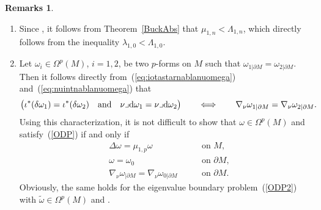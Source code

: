 \documentclass[10pt,a4paper]{amsart}
\numberwithin{equation}{section}
\theoremstyle{definition}
\newtheorem{Remarks}[Theorem]{Remarks}
\begin{document}
\begin{Remarks}\label{r:Schifferreformulated}
\noindent\begin{enumerate}\itemsep=0pt
\item Since , it follows from Theorem~\ref{BuckAbs} that $\mu_{1,n}<\Lambda_{1,n}$, which directly follows from the inequality $\lambda_{1,0}<\Lambda_{1,0}$.
\item Let $\omega_i\in\Omega^p(M)$, $i=1,2$, be two $p$-forms on $M$ such that $\omega_{1|\partial M}=\omega_{2|\partial M}$. Then it follows directly from~(\ref{eq:iotastarnablanuomega}) and~(\ref{eq:nuintnablanuomega}) that
\[
\bigl(\iota^*(\delta\omega_1)=\iota^*(\delta\omega_2)\quad\text{and}\quad\nu\lrcorner {\rm d}\omega_1=\nu\lrcorner {\rm d}\omega_2\bigr)\qquad\Longleftrightarrow\qquad\nabla_\nu\omega_{1|\partial M}=\nabla_\nu\omega_{2|\partial M}.
\]
Using this characterization, it is not difficult to show that $\omega\in\Omega^p(M)$ and  satisfy~(\ref{ODP}) if and only if
\[
\begin{aligned}
&\Delta \omega =\mu_{1,p} \omega \ \quad &&\textrm{on } M, \\
&\omega = \omega_0\ \quad && \textrm{on }\partial M, \\
&\nabla_\nu\omega_{|\partial M} = \nabla_\nu\omega_{0|\partial M}\ \quad &&\textrm{on }\partial M.
\end{aligned}
\]
Obviously, the same holds for the eigenvalue boundary problem~(\ref{ODP2}) with $\widetilde{\omega}\in\Omega^p(M)$ and .
\end{enumerate}
\end{Remarks}
\end{document}
